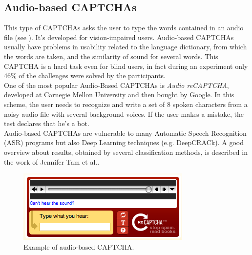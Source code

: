 \subsection{Audio-based CAPTCHAs}
This type of CAPTCHAs asks the user to type the words contained in an audio file (see ). It's developed for vision-impaired users. Audio-based CAPTCHAs usually have problems in usability related to the language dictionary, from which the words are taken, and the similarity of sound for several words. This CAPTCHA is a hard task even for blind users, in fact  during an experiment only 46\% of the challenges were solved by the participants\cite{usability_audio}.\\
One of the most popular Audio-Based CAPTCHAs is \textit{Audio reCAPTCHA}, developed at Carnegie Mellon University and then bought by Google. In this scheme, the user needs to recognize and write a set of 8 spoken characters from a noisy audio file with several background voices. If the user makes a mistake, the test declares that he's a bot.\\
Audio-based CAPTCHAs are vulnerable to many Automatic Speech Recognition (ASR) programs\cite{improving_audio} but also Deep Learning techniques (e.g. DeepCRACk\cite{DeepCRACk}). A good overview about results, obtained by several classification methods, is described in the work of Jennifer Tam et al.\cite{break_audio}.
\begin{figure}[h]
     \centering
     \includegraphics[width=.4\linewidth]{Images/StateOfArt/audio_CAPTCHA}
     \caption{\footnotesize{Example of audio-based CAPTCHA.}}\label{soa:audio_CAPTCHA}
\end{figure}

